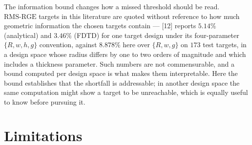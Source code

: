 \documentclass[11pt]{article}
\newcommand{\rge}{\mathrm{RMS\text{-}RGE}}
\begin{document}
The information bound changes how a missed threshold should be read. $\rge$
targets in this literature are quoted without reference to how much geometric
information the chosen targets contain --- [12] reports $5.14\%$ (analytical) and $3.46\%$ (FDTD) for one target design under its four-parameter $\{R,w,h,g\}$ convention, against $8.878\%$ here over $\{R,w,g\}$ on $173$ test targets, in a design space whose radius differs by one to two orders of magnitude and which includes a thickness parameter. Such numbers are not commensurable, and a bound
computed per design space is what makes them interpretable. Here the bound
establishes that the shortfall is addressable; in another design space the
same computation might show a target to be unreachable, which is equally
useful to know before pursuing it.

\section{Limitations}
\label{sec:limits}
\end{document}
